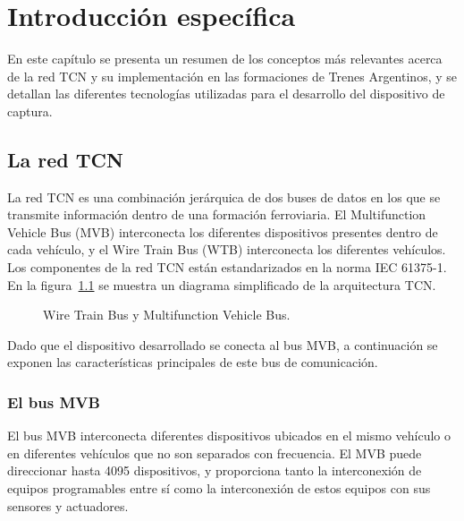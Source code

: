 \chapter{Introducción específica}

En este capítulo se presenta un resumen de los conceptos más relevantes acerca de la red TCN y su implementación en las formaciones de Trenes Argentinos, y se detallan las diferentes tecnologías utilizadas para el desarrollo del dispositivo de captura.

\section{La red TCN}

La red TCN es una combinación jerárquica de dos buses de datos en los que se transmite información dentro de una formación ferroviaria. El Multifunction Vehicle Bus (MVB) interconecta los diferentes dispositivos presentes dentro de cada vehículo, y el Wire Train Bus (WTB) interconecta los diferentes vehículos. Los componentes de la red TCN están estandarizados en la norma IEC 61375-1. En la figura~\ref{fig:tcn-mvb-wtb} se muestra un diagrama simplificado de la arquitectura TCN.

\begin{figure}[htbp]
	\centering
    {
        \fontsize{9pt}{9pt}\selectfont
        
    }
	\caption[Wire Train Bus y Multifunction Vehicle Bus]{Wire Train Bus y Multifunction Vehicle Bus.\footnotemark}
    \label{fig:tcn-mvb-wtb}
\end{figure}

Dado que el dispositivo desarrollado se conecta al bus MVB, a continuación se exponen las características principales de este bus de comunicación.

\subsection{El bus MVB}

El bus MVB interconecta diferentes dispositivos ubicados en el mismo vehículo o en diferentes vehículos que no son separados con frecuencia. El MVB puede direccionar hasta 4095 dispositivos, y proporciona tanto la interconexión de equipos programables entre sí como la interconexión de estos equipos con sus sensores y actuadores.

